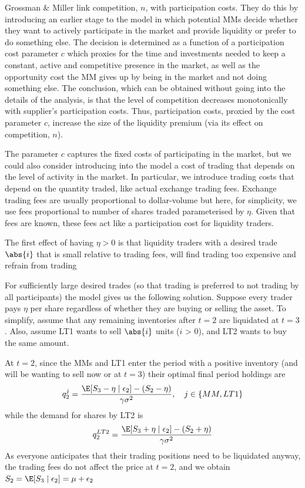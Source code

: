 \documentclass[11pt]{article}
\begin{document}
Grossman \& Miller link competition, \(n\), with participation costs. They do this by introducing an
earlier stage to the model in which potential MMs decide whether they want to actively participate in
the market and provide liquidity or prefer to do something else. The decision is determined as a
function of a participation cost parameter \(c\) which proxies for the time and investments needed to
keep a constant, active and competitive presence in the market, as well as the opportunity cost the MM
gives up by being in the market and not doing something else. The conclusion, which can be obtained
without going into the details of the analysis, is that the level of competition decreases
monotonically with supplier's participation costs. Thus, participation costs, proxied by the cost
parameter \(c\), increase the size of the liquidity premium (via its effect on competition, \(n\)).

The parameter \(c\) captures the fixed costs of participating in the market, but we could also
consider introducing into the model a cost of trading that depends on the level of activity in the
market. In particular, we introduce trading costs that depend on the quantity traded, like actual
exchange trading fees. Exchange trading fees are usually proportional to dollar-volume but here, for
simplicity, we use fees proportional to number of shares traded parameterised by \(\eta\). Given that
fees are known, these fees act like a participation cost for liquidity traders.

The first effect of having \(\eta>0\) is that liquidity traders with a desired trade \(\abs{i}\) that
is small relative to trading fees, will find trading too expensive and refrain from trading

For sufficiently large desired trades (so that trading is preferred to not trading by all
participants) the model gives us the following solution. Suppose every trader pays \(\eta\) per share
regardless of whether they are buying or selling the asset. To simplify, assume that any remaining
inventories after \(t=2\) are liquidated at \(t=3\). Also, assume LT1 wants to sell \(\abs{i}\) units
(\(i\) > 0), and LT2 wants to buy the same amount.


At \(t=2\), since the MMs and LT1 enter the period with a positive inventory (and will be wanting to
sell now or at \(t=3\)) their optimal final period holdings are
\begin{equation*}
q_2^j=\frac{\E[S_3-\eta\mid\epsilon_2]-(S_2-\eta)}{\gamma\sigma^2},\quad j\in\{MM,LT1\}
\end{equation*}
while the demand for shares by LT2 is
\begin{equation*}
q_2^{LT2}=\frac{\E[S_3+\eta\mid \epsilon_2]-(S_2+\eta)}{\gamma\sigma^2}
\end{equation*}
As everyone anticipates that their trading positions need to be liquidated anyway, the trading fees do
not affect the price at \(t=2\), and we obtain \(S_2=\E[S_3\mid\epsilon_2]=\mu+\epsilon_2\)
\end{document}
